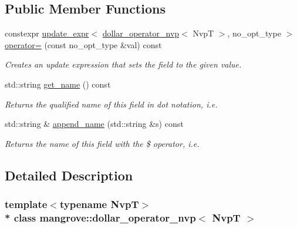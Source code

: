 \subsection*{Public Member Functions}
\begin{DoxyCompactItemize}
\item 
constexpr \hyperlink{classmangrove_1_1update__expr}{update\+\_\+expr}$<$ \hyperlink{classmangrove_1_1dollar__operator__nvp}{dollar\+\_\+operator\+\_\+nvp}$<$ NvpT $>$, no\+\_\+opt\+\_\+type $>$ \hyperlink{classmangrove_1_1dollar__operator__nvp_ac739769fda6972313f0e47b2de1895e0}{operator=} (const no\+\_\+opt\+\_\+type \&val) const \hypertarget{classmangrove_1_1dollar__operator__nvp_ac739769fda6972313f0e47b2de1895e0}{}\label{classmangrove_1_1dollar__operator__nvp_ac739769fda6972313f0e47b2de1895e0}

\begin{DoxyCompactList}\small\item\em Creates an update expression that sets the field to the given value. \end{DoxyCompactList}\item 
std\+::string \hyperlink{classmangrove_1_1dollar__operator__nvp_ac2114ccfa0dc154026e8201064aef2e7}{get\+\_\+name} () const 
\begin{DoxyCompactList}\small\item\em Returns the qualified name of this field in dot notation, i.\+e. \end{DoxyCompactList}\item 
std\+::string \& \hyperlink{classmangrove_1_1dollar__operator__nvp_a7e052ba214d67a41b12964fa186c8210}{append\+\_\+name} (std\+::string \&s) const 
\begin{DoxyCompactList}\small\item\em Returns the name of this field with the \$ operator, i.\+e. \end{DoxyCompactList}\end{DoxyCompactItemize}


\subsection{Detailed Description}
\subsubsection*{template$<$typename NvpT$>$\\*
class mangrove\+::dollar\+\_\+operator\+\_\+nvp$<$ Nvp\+T $>$}

